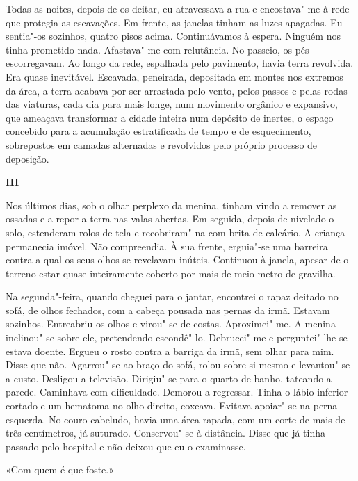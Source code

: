 Todas as noites, depois de os deitar, eu atravessava a rua e
encostava"-me à rede que protegia as escavações. Em frente, as janelas
tinham as luzes apagadas. Eu sentia"-os sozinhos, quatro pisos acima.
Continuávamos à espera. Ninguém nos tinha prometido nada. Afastava"-me
com relutância. No passeio, os pés escorregavam. Ao longo da rede,
espalhada pelo pavimento, havia terra revolvida. Era quase inevitável.
Escavada, peneirada, depositada em montes nos extremos da área, a terra
acabava por ser arrastada pelo vento, pelos passos e pelas rodas das
viaturas, cada dia para mais longe, num movimento orgânico e expansivo,
que ameaçava transformar a cidade inteira num depósito de inertes, o
espaço concebido para a acumulação estratificada de tempo e de
esquecimento, sobrepostos em camadas alternadas e revolvidos pelo
próprio processo de deposição.

\vspace*{1.8cm}
\noindent{}\textbf{III}

\bigskip

Nos últimos dias, sob o olhar perplexo da menina, tinham vindo a remover
as ossadas e a repor a terra nas valas abertas. Em seguida, depois de
nivelado o solo, estenderam rolos de tela e recobriram"-na com brita de
calcário. A criança permanecia imóvel. Não compreendia. À sua frente,
erguia"-se uma barreira contra a qual os seus olhos se revelavam
inúteis. Continuou à janela, apesar de o terreno estar quase
inteiramente coberto por mais de meio metro de gravilha.

Na segunda"-feira, quando cheguei para o jantar, encontrei o rapaz
deitado no sofá, de olhos fechados, com a cabeça pousada nas pernas da
irmã. Estavam sozinhos. Entreabriu os olhos e virou"-se de costas.
Aproximei"-me. A menina inclinou"-se sobre ele, pretendendo escondê"-lo.
Debrucei"-me e perguntei"-lhe se estava doente. Ergueu o rosto contra a
barriga da irmã, sem olhar para mim. Disse que não. Agarrou"-se ao braço
do sofá, rolou sobre si mesmo e levantou"-se a custo. Desligou a
televisão. Dirigiu"-se para o quarto de banho, tateando a parede.
Caminhava com dificuldade. Demorou a regressar. Tinha o lábio inferior
cortado e um hematoma no olho direito, coxeava. Evitava apoiar"-se na
perna esquerda. No couro cabeludo, havia uma área rapada, com um corte
de mais de três centímetros, já suturado. Conservou"-se à distância.
Disse que já tinha passado pelo hospital e não deixou que eu o
examinasse.

«Com quem é que foste.»

